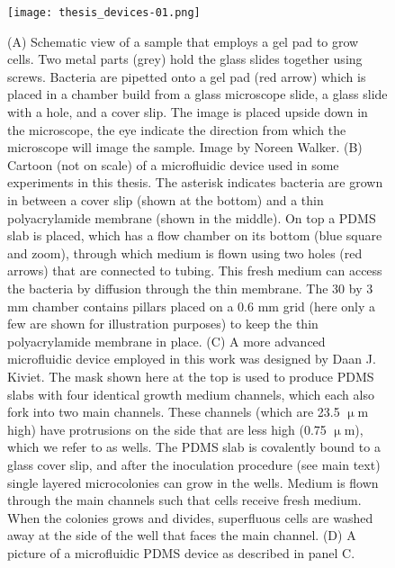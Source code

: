 %
%

\begin{figure}
	\centering
	\texttt{[image: thesis\_devices-01.png]}
	\caption{ 
		(A) Schematic view of a sample that employs a gel pad to grow cells. Two metal parts (grey) hold the glass slides together using screws. Bacteria are pipetted onto a gel pad (red arrow) which is placed in a chamber build from a glass microscope slide, a glass slide with a hole, and a cover slip. The image is placed upside down in the microscope, the eye indicate the direction from which the microscope will image the sample. Image by Noreen Walker.
		(B) Cartoon (not on scale) of a microfluidic device used in some experiments in this thesis. 
		The asterisk indicates bacteria are grown in between a cover slip (shown at the bottom) and a thin polyacrylamide membrane (shown in the middle).
		On top a PDMS slab is placed, which has a flow chamber on its bottom (blue square and zoom), through which medium is flown using two holes (red arrows) that are connected to tubing. 
		This fresh medium can access the bacteria by diffusion through the thin membrane. 
		The 30 by 3 mm chamber contains pillars placed on a 0.6 mm grid (here only a few are shown for illustration purposes) to keep the thin polyacrylamide membrane in place. 
		(C) A more advanced microfluidic device employed in this work was designed by Daan J. Kiviet. 
		The mask shown here at the top is used to produce PDMS slabs with four identical growth medium channels, which each also fork into two main channels. 
		These channels (which are 23.5 $\upmu$m high) have protrusions on the side that are less high (0.75 $\upmu$m), which we refer to as wells.
		The PDMS slab is covalently bound to a glass cover slip, and after the inoculation procedure (see main text) single layered microcolonies can grow in the wells.
		Medium is flown through the main channels such that cells receive fresh medium. 
		When the colonies grows and divides, superfluous cells are washed away at the side of the well that faces the main channel.		
		(D) A picture of a microfluidic PDMS device as described in panel C.
	}
	\label{fig:mm:devices}
\end{figure}


